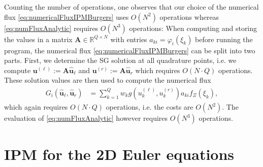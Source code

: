 Counting the number of operations, one observes that our choice of the numerical flux \eqref{eq:numericalFluxIPMBurgers} uses $O(N^2)$ operations whereas \eqref{eq:numFluxAnalytic} requires $O(N^3)$ operations: When computing and storing the values in a matrix $\bm A\in\mathbb{R}^{Q\times N}$ with entries $a_{ki} = \varphi_i(\xi_k)$ before running the program, the numerical flux \eqref{eq:numericalFluxIPMBurgers} can be split into two parts. First, we determine the SG solution at all quadrature points, i.e. we compute $\bm{u}^{(\ell)} := \bm A \bm{\hat u}_{\ell}$ and $\bm{u}^{(r)} := \bm A \bm{\hat u}_{r}$ which requires $O(N\cdot Q)$ operations. These solution values are then used to compute the numerical flux
\begin{align*}
G_i(\bm{\hat u}_{\ell},\bm{\hat u}_{r}) &= \sum_{k=1}^Q w_k g(u^{(\ell)}_k,u^{(r)}_k)a_{ki}f_{\Xi}(\xi_k),
\end{align*}
which again requires $O(N\cdot Q)$ operations, i.e. the costs are $O(N^2)$. The evaluation of \eqref{eq:numFluxAnalytic} however requires $O(N^3)$ operations.

\section{IPM for the 2D Euler equations}
\label{app:IPM2DEuler}

